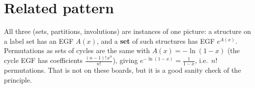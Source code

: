 \documentclass[11pt]{article}
\begin{document}
\section*{Related pattern}

All three (sets, partitions, involutions) are instances of one picture: a structure on a label set has an EGF $A(x)$, and a \textbf{set} of such structures has EGF $e^{A(x)}$. Permutations as sets of cycles are the same with $A(x)=-\ln(1-x)$ (the cycle EGF has coefficients $\frac{(n-1)!\,x^n}{n!}$), giving $e^{-\ln(1-x)}=\frac1{1-x}$, i.e.\ $n!$ permutations. That is not on these boards, but it is a good sanity check of the principle.
\end{document}

